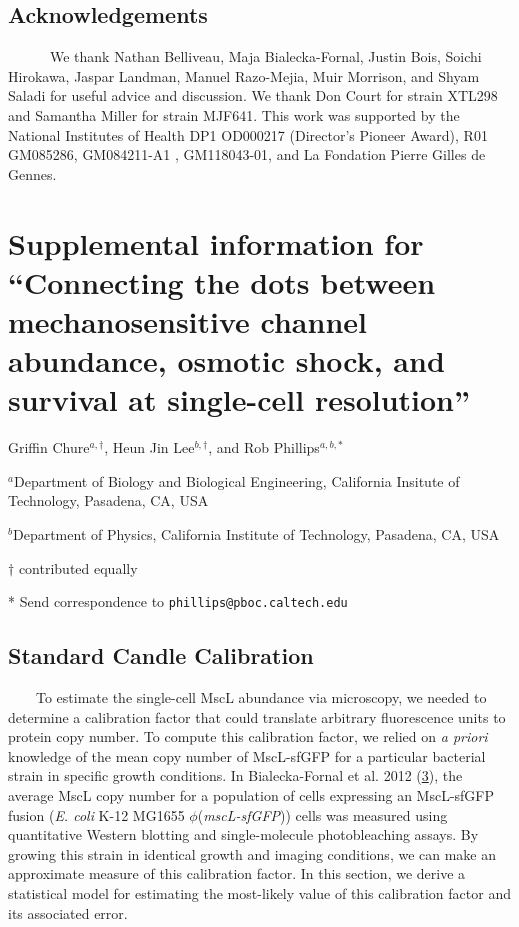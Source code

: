 \subsection{Acknowledgements}\label{acknowledgements}

~ ~ ~
~We
thank
Nathan
Belliveau,
Maja
Bialecka-Fornal,
Justin
Bois,
Soichi
Hirokawa,
Jaspar
Landman,
Manuel
Razo-Mejia,
Muir
Morrison,
and
Shyam
Saladi
for
useful
advice
and
discussion.
We
thank
Don
Court
for
strain
XTL298
and
Samantha
Miller
for
strain
MJF641.
This
work
was
supported
by the
National
Institutes
of
Health
DP1
OD000217
(Director's
Pioneer
Award),
R01
GM085286,
GM084211-A1
,
GM118043-01,
and La
Fondation
Pierre
Gilles
de
Gennes.

\section{\texorpdfstring{Supplemental
information
for
``Connecting
the
dots
between
mechanosensitive
channel
abundance,
osmotic
shock,
and
survival
at
single-cell
resolution''}{Supplemental information for Connecting the dots between mechanosensitive channel abundance, osmotic shock, and survival at single-cell resolution}}\label{supplemental-information-for-connecting-the-dots-between-mechanosensitive-channel-abundance-osmotic-shock-and-survival-at-single-cell-resolution}

Griffin
Chure\(^{a, \dagger}\),
Heun
Jin
Lee\(^{b, \dagger}\),
and
Rob
Phillips\(^{a,b, *}\)

\(^a\)Department
of
Biology
and
Biological
Engineering,
California
Insitute
of
Technology,
Pasadena,
CA,
USA

\(^b\)Department
of
Physics,
California
Institute
of
Technology,
Pasadena,
CA,
USA

\(\dagger\)
contributed
equally

* Send
correspondence
to
\texttt{phillips@pboc.caltech.edu}

\subsection{Standard
Candle
Calibration}\label{standard-candle-calibration}

~~~~To
estimate
the
single-cell
MscL
abundance
via
microscopy,
we
needed
to
determine
a
calibration
factor
that
could
translate
arbitrary
fluorescence
units
to
protein
copy
number.
To
compute
this
calibration
factor,
we
relied
on
\emph{a
priori}
knowledge
of the
mean
copy
number
of
MscL-sfGFP
for a
particular
bacterial
strain
in
specific
growth
conditions.
In
Bialecka-Fornal
et al.
2012
(\protect\hyperlink{ref-bialecka-fornal2012}{3}),
the
average
MscL
copy
number
for a
population
of
cells
expressing
an
MscL-sfGFP
fusion
(\emph{E.
coli}
K-12
MG1655
\(\phi\)(\emph{mscL-sfGFP}))
cells
was
measured
using
quantitative
Western
blotting
and
single-molecule
photobleaching
assays.
By
growing
this
strain
in
identical
growth
and
imaging
conditions,
we can
make
an
approximate
measure
of
this
calibration
factor.
In
this
section,
we
derive
a
statistical
model
for
estimating
the
most-likely
value
of
this
calibration
factor
and
its
associated
error.

